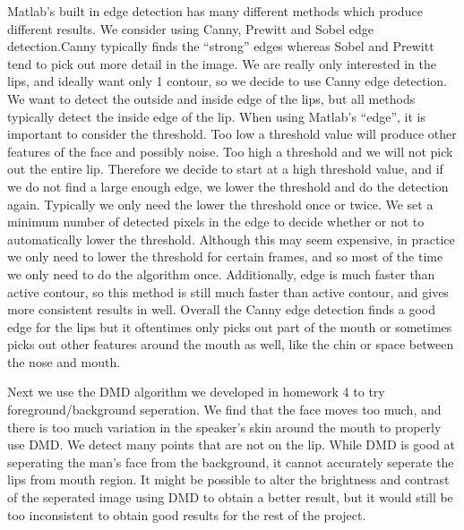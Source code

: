 \documentclass[a4paper]{article}
\begin{document}
Matlab's built in edge detection has many different methods which produce different results. We consider using Canny, Prewitt and Sobel edge detection.Canny typically finds the ``strong'' edges whereas Sobel and Prewitt tend to pick out more detail in the image. We are really only interested in the lips, and ideally want only 1 contour, so we decide to use Canny edge detection. We want to detect the outside and inside edge of the lips, but all methods typically detect  the inside edge of the lip. When using Matlab's ``edge'', it is important to consider the threshold. Too low a threshold value will produce other features of the face and possibly noise. Too high a threshold and we will not pick out the entire lip. Therefore we decide to start at a high threshold value, and if we do not find a large enough edge, we lower the threshold and do the detection again. Typically we only need the lower the threshold once or twice. We set a minimum number of detected pixels in the edge to decide whether or not to automatically lower the threshold. Although this may seem expensive, in practice we only need to lower the threshold for certain frames, and so most of the time we only need to do the algorithm once.  Additionally, edge is much faster than active contour, so this method is still much faster than active contour, and gives more consistent results in well. Overall the Canny edge detection finds a good edge for the lips but it oftentimes only picks out part of the mouth or sometimes picks out other features around the mouth as well, like the chin or space between the nose and mouth.\par
Next we use the DMD algorithm we developed in homework 4 to try foreground/background seperation. We find that the face moves too much, and there is too much variation in the speaker's skin around the mouth to properly use DMD. We detect many points that are not on the lip. While DMD is good at seperating the man's face from the background, it cannot accurately seperate the lips from mouth region. It might be possible to alter the brightness and contrast of the seperated image using DMD to obtain a better result, but it would still be too inconsistent to obtain good results for the rest of the project. \par
\end{document}

